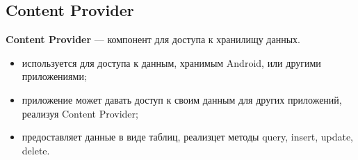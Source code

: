 \subsection{Content Provider}
\textbf{Content Provider} --- компонент для доступа к хранилищу данных.

\begin{itemize}
	\item используется для доступа к данным, хранимым Android, или другими приложениями;
	\item приложение может давать доступ к своим данным для других приложений, реализуя Content Provider;
	\item предоставляет данные в виде таблиц, реализцет методы query, insert, update, delete.
\end{itemize}